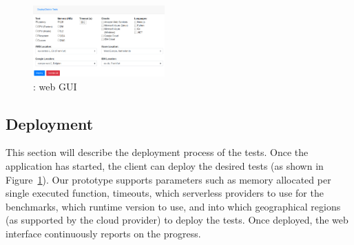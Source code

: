 \begin{figure}[!t]
\begin{center}
\includegraphics[width=0.45\textwidth]{bilder/ui.png}
\caption{\sys: web GUI}
\label{fig:ui}
\end{center}
\end{figure}

\subsection{Deployment}
This section will describe the deployment process of the tests.
Once the application has started, the client can deploy the desired tests (as shown in Figure~\ref{fig:ui}).
Our prototype supports parameters such as memory allocated per single executed function, timeouts, which serverless providers to use for the benchmarks, which runtime version to use, and into which geographical regions (as supported by the cloud provider) to deploy the tests. 
Once deployed, the web interface continuously reports on the progress. 
